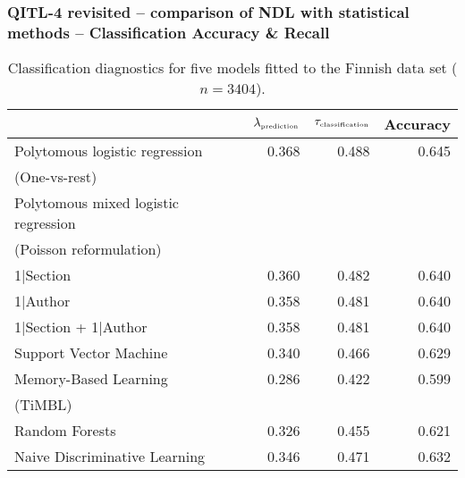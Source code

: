 \begin{frame}
\frametitle{QITL-4 revisited -- comparison of NDL with statistical methods -- Classification Accuracy \& Recall}

\begin{table}[ht]
  \begin{center}
    {\footnotesize
      \begin{tabular}{lrrr}
        \hline
        & $\lambda_{\mbox{\tiny prediction}}$ & $\tau_{\mbox{\tiny classification}}$ & Accuracy \\
        \hline
        Polytomous logistic regression & 0.368 & 0.488 & 0.645 \\
        (One-vs-rest) &  &  &  \\
        Polytomous mixed logistic regression &  &  &  \\
        (Poisson reformulation) &  &  &  \\
        1|Section & 0.360 & 0.482 & 0.640 \\
        1|Author & 0.358 & 0.481 & 0.640 \\
        1|Section + 1|Author & 0.358 & 0.481 & 0.640 \\
        Support Vector Machine & 0.340 & 0.466 & 0.629 \\
        Memory-Based Learning & 0.286 & 0.422 & 0.599 \\
        (TiMBL) &  &  &  \\
        Random Forests & 0.326 & 0.455 & 0.621 \\
        Naive Discriminative Learning & 0.346 & 0.471 & 0.632 \\
        \hline
      \end{tabular}
    }
    \caption{Classification diagnostics for five models fitted to the Finnish data set ($n=3404$).}
    \label{tab:results}
  \end{center}
\end{table}

\end{frame}

